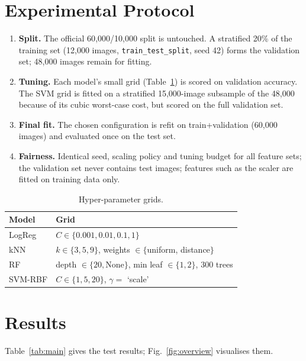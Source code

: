 \documentclass[conference]{IEEEtran}
\begin{document}
\section{Experimental Protocol}
\begin{enumerate}
\item \textbf{Split.} The official 60{,}000/10{,}000 split is untouched. A stratified 20\% of the training set (12{,}000 images, \texttt{train\_test\_split}, seed 42) forms the validation set; 48{,}000 images remain for fitting.
\item \textbf{Tuning.} Each model's small grid (Table~\ref{tab:grid}) is scored on validation accuracy. The SVM grid is fitted on a stratified 15{,}000-image subsample of the 48{,}000 because of its cubic worst-case cost, but scored on the full validation set.
\item \textbf{Final fit.} The chosen configuration is refit on train+validation (60{,}000 images) and evaluated once on the test set.
\item \textbf{Fairness.} Identical seed, scaling policy and tuning budget for all feature sets; the validation set never contains test images; features such as the scaler are fitted on training data only.
\end{enumerate}

\begin{table}[t]\centering\caption{Hyper-parameter grids.}\label{tab:grid}
\begin{tabular}{@{}ll@{}}\toprule Model & Grid\\\midrule
LogReg & $C\in\{0.001,0.01,0.1,1\}$\\
kNN & $k\in\{3,5,9\}$, weights $\in\{$uniform, distance$\}$\\
RF & depth $\in\{20,\text{None}\}$, min leaf $\in\{1,2\}$, 300 trees\\
SVM-RBF & $C\in\{1,5,20\}$, $\gamma=$ `scale'\\\bottomrule\end{tabular}\end{table}

\section{Results}\label{sec:results}
Table~\ref{tab:main} gives the test results; Fig.~\ref{fig:overview} visualises them.
\end{document}
